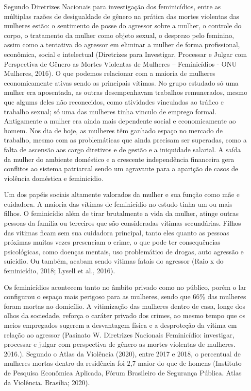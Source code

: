 Segundo Diretrizes Nacionais para investigação dos feminicídios, entre as múltiplas razões de desigualdade de gênero na prática das mortes violentas das mulheres estão: o sentimento de posse do agressor sobre a mulher, o controle do corpo, o tratamento da mulher como objeto sexual, o desprezo pelo feminino, assim como a tentativa do agressor em eliminar a mulher de forma profissional, econômica, social e intelectual (Diretrizes para Investigar, Processar e Julgar com Perspectiva de Gênero as Mortes Violentas de Mulheres – Feminicídios - ONU Mulheres, 2016). O que podemos relacionar com a maioria de mulheres economicamente ativas sendo as principais vítimas. No grupo estudado só uma mulher era aposentada, as outras desempenhavam trabalhos remunerados, mesmo que algums deles não reconecidos, como atividades vinculadas ao tráfico e trabalho sexual; só uma das mulheres tinha vinculo de emprego formal. Antigamente a mulher era ainda mais dependente social e economicamente ao homem. Nos dia de hoje, as mulheres têm ganhado espaço no mercado de trabalho, mesmo com as problemáticas que ainda precisam ser superadas, como a falta de ascensão aos cargo diretivos e de gestão e a iniquidade salarial. A saída da mulher do ambiente doméstico e a crescente independência financeira gera conflitos ao sistema patriarcal sendo um agravante para a aparição de casos de violência doméstica e feminicídio.

Um dos papéis sociais altamente valorados da mulher e sua função como mãe e cuidadora. A maioria das vítimas de feminicídio no estudo tinha um ou mais filhos. O feminicídio além de tirar brutalmente a vida da mulher, atinge outras pessoas da família ou terceiros que são consideradas vítimas secundárias. Filhos das vitimas ficam sem sua cuidadora principal, tanto eles quanto as pessoas próximas muitas vezes presenciam o crime, o que pode ter consequências psicológicas, como doenças mentais, uso problemático de drogas, auto agressão e suicídio. Ou também, acabam sendo vítimas fatais do agressor (Raio x do feminicídio, 2018; Lysell et al., 2016).

Os feminicídios acontecem tanto no âmbito privado como no público, porém o lar configurou o espaço mais perigoso para as mulheres, sendo que 66\% das mulheres foram mortas no domicílio. A vitimização das mulheres dentro de casa, longe dos olhos da sociedade, reforça o caráter privado dos crimes, ao mesmo tempo que os meios empregados sugerem a desvantagem física e a desproteção da vítima em relação ao agressor (Pasinato W. Diretrizes Nacionais Feminicídio: investigar, processar e julgar com perspectiva de gênero as mortes violentas de mulheres. 2016.). Segundo o Atlas da Violência (2020), entre 2017 e 2018, o percentual de mulheres mortas dentro da residência foi 2,7 maior do que de homens (Instituto de Pesquisa Econômica Aplicada, Fórum Brasileiro de Segurança Pública. Atlas da Violência. Brasília; 2020).

